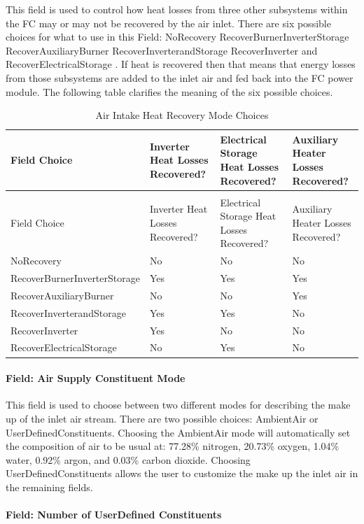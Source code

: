 This field is used to control how heat losses from three other subsystems within the FC may or may not be recovered by the air inlet. There are six possible choices for what to use in this Field: NoRecovery RecoverBurnerInverterStorage RecoverAuxiliaryBurner RecoverInverterandStorage RecoverInverter and RecoverElectricalStorage . If heat is recovered then that means that energy losses from those subsystems are added to the inlet air and fed back into the FC power module. The following table clarifies the meaning of the six possible choices.

\begin{longtable}[c]{p{1.5in}p{1.5in}p{1.5in}p{1.5in}}
\caption{Air Intake Heat Recovery Mode Choices \label{table:air-intake-heat-recovery-mode-choices}} \tabularnewline
\toprule 
Field Choice & Inverter Heat Losses Recovered? & Electrical Storage Heat Losses Recovered? & Auxiliary Heater Losses Recovered? \tabularnewline
\midrule
\endfirsthead

\caption[]{Air Intake Heat Recovery Mode Choices} \tabularnewline
\toprule 
Field Choice & Inverter Heat Losses Recovered? & Electrical Storage Heat Losses Recovered? & Auxiliary Heater Losses Recovered? \tabularnewline
\midrule
\endhead

NoRecovery & No & No & No \tabularnewline
RecoverBurnerInverterStorage & Yes & Yes & Yes \tabularnewline
RecoverAuxiliaryBurner & No & No & Yes \tabularnewline
RecoverInverterandStorage & Yes & Yes & No \tabularnewline
RecoverInverter & Yes & No & No \tabularnewline
RecoverElectricalStorage & No & Yes & No \tabularnewline
\bottomrule
\end{longtable}

\paragraph{Field: Air Supply Constituent Mode}\label{field-air-supply-constituent-mode}

This field is used to choose between two different modes for describing the make up of the inlet air stream. There are two possible choices: AmbientAir or UserDefinedConstituents. Choosing the AmbientAir mode will automatically set the composition of air to be usual at: 77.28\% nitrogen, 20.73\% oxygen, 1.04\% water, 0.92\% argon, and 0.03\% carbon dioxide. Choosing UserDefinedConstituents allows the user to customize the make up the inlet air in the remaining fields.

\paragraph{Field: Number of UserDefined Constituents}\label{field-number-of-userdefined-constituents}

